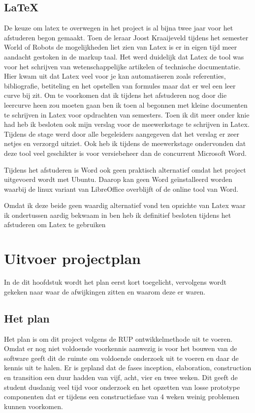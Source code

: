 \documentclass[a4paper, 11pt, oneside]{report}
\begin{document}
\section{\LaTeX}

De keuze om latex te overwegen in het project is al bijna twee jaar voor het afstuderen begon gemaakt. 
Toen de leraar Joost Kraaijeveld tijdens het semester World of Robots de mogelijkheden liet zien van Latex is er in eigen tijd meer aandacht gestoken in de markup taal.
Het werd duidelijk dat Latex de tool was voor het schrijven van wetenschappelijke artikelen of technische documentatie.
Hier kwam uit dat Latex veel voor je kan automatiseren zoals referenties, bibliografie, betiteling en het opstellen van formules maar dat er wel een leer curve bij zit.
Om te voorkomen dat ik tijdens het afstuderen nog door die leercurve heen zou moeten gaan ben ik toen al begonnen met kleine documenten te schrijven in Latex voor opdrachten van semesters.
Toen ik dit meer onder knie had heb ik besloten ook mijn verslag voor de meewerkstage te schrijven in Latex.
Tijdens de stage werd door alle begeleiders aangegeven dat het verslag er zeer netjes en verzorgd uitziet.
Ook heb ik tijdens de meewerkstage ondervonden dat deze tool veel geschikter is voor versiebeheer dan de concurrent Microsoft Word.

Tijdens het afstuderen is Word ook geen praktisch alternatief omdat het project uitgevoerd wordt met Ubuntu. 
Daarop kan geen Word geïnstalleerd worden waarbij de linux variant van LibreOffice overblijft of de online tool van Word.

Omdat ik deze beide geen waardig alternatief vond ten opzichte van Latex waar ik ondertussen aardig bekwaam in ben heb ik definitief besloten tijdens het afstuderen om Latex te gebruiken

\chapter{Uitvoer projectplan}\label{sec:uitvoer-projectplan}
In de dit hoofdstuk wordt het plan eerst kort toegelicht, vervolgens wordt gekeken naar waar de afwijkingen zitten en waarom deze er waren.


\section{Het plan}\label{sec:het-plan}
Het plan is om dit project volgens de RUP ontwikkelmethode uit te voeren. 
Omdat er nog niet voldoende voorkennis aanwezig is voor het bouwen van de software geeft dit de ruimte om voldoende onderzoek uit te voeren en daar de kennis uit te halen. 
Er is gepland dat de fases inception, elaboration, construction en transition een duur hadden van vijf, acht, vier en twee weken. Dit geeft de student dusdanig veel tijd voor onderzoek en het opzetten van losse prototype componenten dat er tijdens een constructiefase van 4 weken weinig problemen kunnen voorkomen. 
\end{document}
